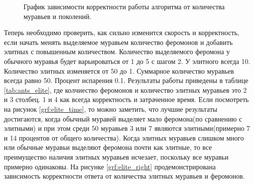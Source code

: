 \documentclass[12pt, a4paper]{report}
\begin{document}
    	\begin{figure}[ht!]
    		\centering
    		\caption{График зависимости корректности работы алгоритма от количества муравьев и поколений.}
    		\label{grf:ants_right}
    	\end{figure}
    	
    		Теперь необходимо проверить, как сильно изменится скорость и корректность, если начать менять выделяемое муравьем количество феромонов и добавить элитных с повышенным количеством. Количество выделяемого феромона у обычного муравья будет варьироваться от 1 до 5 с шагом 2. У элитного всегда 10. Количество элитных изменяется от 50 до 1. Суммарное количество муравьев всегда равно 50. Процент испарения 0.1. Результаты работы приведены в таблице \ref{tab:ants_elite}, где колчиество феромонов и количество элитных муравьев это 2 и 3 столбец. 1 и 4 как всегда корректность и затраченное время.  Если посмотреть на рисунок \ref{grf:elite_time}, то можно заметить, что лучшие результаты достигаются, когда обычный муравей выделяет мало феромона(по сравнению с элитными) и при этом среди 50 муравьев 3 или 7 являются элитными(примерно 7 и 14 процентов от общего количества). Когда элитных муравьев слишком много или обычные муравьи выделяют феромона почти как элитные, то все преимущество наличия элитных муравьев исчезает, поскольку все муравьи примерно одинаковы. На рисунке \ref{grf:elite_right} продемонстрирована зависимость корректности ответа от количества элитных муравьев и феромонов.
    		
\end{document}
